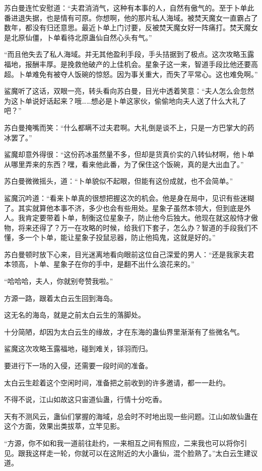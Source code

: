 \begin{this_body}
苏白曼连忙安慰道：“夫君消消气，这种有本事的人，自然有傲气的。至于卜单此番进退失据，也是情有可原。你想啊，他的那片私人海域。被焚天魔女一直霸占了数年，都没有归还意思。最近卜单上门讨要，反被焚天魔女好一阵痛打。焚天魔女是北原仙僵，卜单看待北原蛊仙自然心头有气。”

“而且他失去了私人海域。并无其他盈利手段，手头拮据到了极点。这次攻略玉露福地，报酬丰厚。是挽救他破产的上佳机会。星象子这一来，智道手段比他还要高超。卜单难免有被夺人饭碗的惊怒。因为事关重大，而失了平常心。这也难免啊。”

鲨魔听了这话，双眼一亮，转头看向苏白曼，目光中透着笑意：“夫人怎么会忽然为这卜单说好话起来？哦……想必是卜单这家伙，偷偷地向夫人送了什么大礼了吧？”

苏白曼掩嘴而笑：“什么都瞒不过夫君啊。大礼倒是谈不上，只是一方巴掌大的药冰罢了。”

鲨魔却意外得很：“这份药冰虽然量不多，但却是货真价实的八转仙材啊，他卜单从哪里弄来的东西？嘿，看来他此番，为了保住这个饭碗，真的是大出血了。”

苏白曼微微摇头，道：“卜单貌似不起眼，但能有这份成就，也不会简单。”

鲨魔沉吟道：“看来卜单真的很想把握这次的机会。他是身在局中，见识有些迷糊了。其实就算他本事不济，多少也会有些用处。星象子虽然本领大，但到底是外人。我肯定要带着卜单，制衡这位星象子，防止他今后独大。他现在就这般恃才傲物，将来还得了？万一在攻略的时候，给我们下套子，怎么办？智道的手段我们不懂，多一个卜单，能让星象子投鼠忌器，防止他捣鬼，这就是好的。”

苏白曼顿时放下心来，目光迷离地看向眼前这位自己深爱的男人：“还是我家夫君本领高，卜单、星象子在你的手中，是翻不出什么浪花来的。”

“哈哈哈，夫人，你就别夸赞我啦。”

方源一路，跟着太白云生回到海岛。

这无名的海岛，就是之前太白云生的落脚处。

十分简陋，却因为太白云生的缘故，才在东海的蛊仙界里渐渐有了些微名气。

鲨魔这次攻略玉露福地，碰到难关，铩羽而归。

要进行下一场的入侵，还需要一段时间的准备。

太白云生趁着这个空闲时间，准备把之前收到的许多邀请，都一一赴约。

不得不说，江山如故这只宙道仙蛊，行情十分吃香。

天有不测风云，蛊仙们掌握的海域，总会时不时地出现一些问题。江山如故仙蛊在这个方面，效果出类拔萃，立竿见影。

“方源，你不如和我一道前往赴约，一来相互之间有照应，二来我也可以将你引见。跟我这样走一轮，你就可以在这附近的大小蛊仙，混个脸熟了。”太白云生建议道。


\end{this_body}
